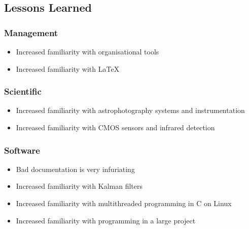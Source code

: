 \pagebreak
\subsection{Lessons Learned}

\subsubsection{Management}

\begin{itemize}
    \item Increased familiarity with organisational tools
    \item Increased familiarity with LaTeX
\end{itemize}


\subsubsection{Scientific}

\begin{itemize}
    \item Increased familiarity with astrophotography systems and instrumentation
    \item Increased familiarity with CMOS sensors and infrared detection
\end{itemize}

\begin{comment}
\subsubsection{Electrical}

\begin{itemize}
    \item Friendship
    \item Sleep deprivation
\end{itemize}

\end{comment}
\subsubsection{Software}

\begin{itemize}
    \item Bad documentation is very infuriating
    \item Increased familiarity with Kalman filters
    \item Increased familiarity with multithreaded programming in C on Linux
    \item Increased familiarity with programming in a large project
\end{itemize}

